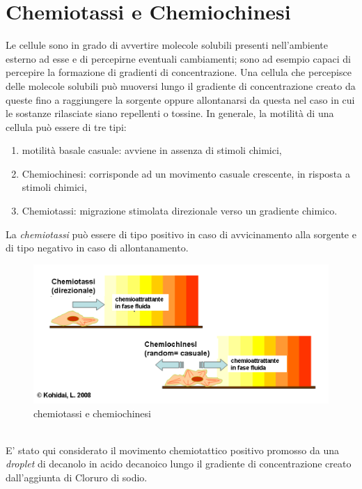 \section{Chemiotassi e Chemiochinesi}
\label{sec:456}
Le cellule sono in grado di avvertire molecole solubili presenti nell'ambiente esterno ad esse e di percepirne eventuali cambiamenti; sono ad esempio capaci di percepire la formazione di gradienti di concentrazione. 
Una cellula che percepisce delle molecole solubili può muoversi lungo il gradiente di concentrazione creato da queste fino a raggiungere la sorgente oppure allontanarsi da questa nel caso in cui le sostanze rilasciate siano repellenti o tossine.
In generale, la motilità di una cellula può essere di tre tipi:
\begin{enumerate}
\item motilità basale casuale: avviene in assenza di stimoli chimici,
\item Chemiochinesi: corrisponde ad un movimento casuale crescente, in risposta a stimoli chimici,
\item Chemiotassi: migrazione stimolata direzionale verso un gradiente chimico.
\end{enumerate}
La \emph{chemiotassi} può essere di tipo positivo in caso di avvicinamento alla sorgente e di tipo negativo in caso di allontanamento.
	\begin{figure}[h]
	  \includegraphics[scale=0.50]{immagini/chemochin.png}
		\centering	
	 \caption{chemiotassi e chemiochinesi}
	\end{figure}
\pagebreak
\\E' stato qui considerato il movimento chemiotattico positivo promosso da una \emph{droplet} di decanolo in acido decanoico lungo il gradiente di concentrazione creato dall'aggiunta di Cloruro di sodio.

